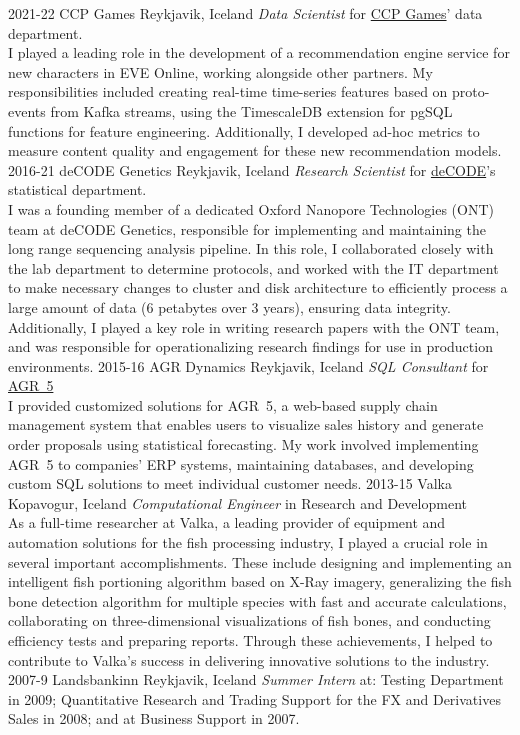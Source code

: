 \begin{entrylist}
\entry
{2021-22}
{CCP Games}
{Reykjavik, Iceland}
{\emph{Data Scientist} for \href{https://www.ccpgames.com/}{CCP Games}' data department.\\
I played a leading role in the development of a recommendation engine service for new characters in EVE Online, working alongside other partners. My responsibilities included creating real-time time-series features based on proto-events from Kafka streams, using the TimescaleDB extension for pgSQL functions for feature engineering. Additionally, I developed ad-hoc metrics to measure content quality and engagement for these new recommendation models.
}
\entry
{2016-21}
{deCODE Genetics}
{Reykjavik, Iceland}
{\emph{Research Scientist} for \href{https://www.decode.com/}{deCODE}'s statistical department.\\
I was a founding member of a dedicated Oxford Nanopore Technologies (ONT) team at deCODE Genetics, responsible for implementing and maintaining the long range sequencing analysis pipeline. In this role, I collaborated closely with the lab department to determine protocols, and worked with the IT department to make necessary changes to cluster and disk architecture to efficiently process a large amount of data (6 petabytes over 3 years), ensuring data integrity. Additionally, I played a key role in writing research papers with the ONT team, and was responsible for operationalizing research findings for use in production environments.
}
\entry
{2015-16}
{AGR Dynamics}
{Reykjavik, Iceland}
{\emph{SQL Consultant} for \href{http://agrdynamics.com/}{AGR~5}\\
I provided customized solutions for AGR~5, a web-based supply chain management system that enables users to visualize sales history and generate order proposals using statistical forecasting. My work involved implementing AGR~5 to companies' ERP systems, maintaining databases, and developing custom SQL solutions to meet individual customer needs.
}    
\entry
{2013-15}
{Valka}
{Kopavogur, Iceland}
{\emph{Computational Engineer} in Research and Development \\
As a full-time researcher at Valka, a leading provider of equipment and automation solutions for the fish processing industry, I played a crucial role in several important accomplishments. These include designing and implementing an intelligent fish portioning algorithm based on X-Ray imagery, generalizing the fish bone detection algorithm for multiple species with fast and accurate calculations, collaborating on three-dimensional visualizations of fish bones, and conducting efficiency tests and preparing reports. Through these achievements, I helped to contribute to Valka's success in delivering innovative solutions to the industry.
}
\entry
{2007-9}
{Landsbankinn}
{Reykjavik, Iceland}
{\emph{Summer Intern} at: Testing Department in 2009; Quantitative Research and Trading Support for the FX and Derivatives Sales in 2008; and at Business Support in 2007.}
\end{entrylist}
